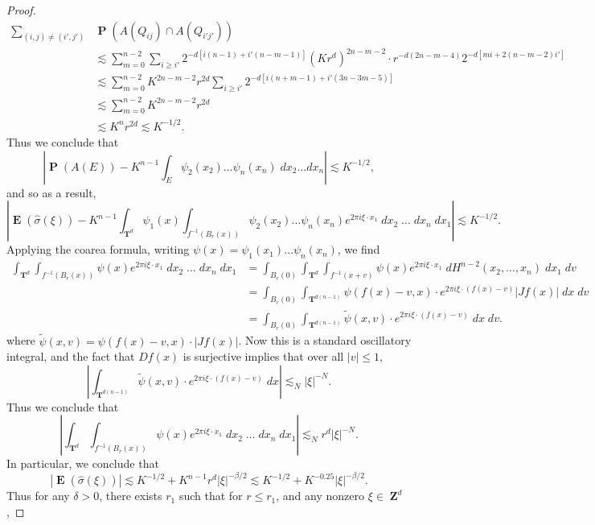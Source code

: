 \documentclass[12pt,reqno]{article}
\numberwithin{equation}{section}
\DeclareMathOperator{\ZZ}{\mathbf{Z}}
\DeclareMathOperator{\TT}{\mathbf{T}}
\numberwithin{theorem}{section}
\DeclareMathOperator{\EE}{\mathbf{E}}
\DeclareMathOperator{\PP}{\mathbf{P}}
\begin{document}
\begin{proof}
    \begin{align*}
        \sum_{(i,j) \neq (i',j')}& \PP(A(Q_{ij}) \cap A(Q_{i'j'}))\\
        &\lesssim \sum_{m = 0}^{n-2} \sum_{i \geq i'} 2^{-d[i(n-1) + i'(n-m-1)]} (Kr^d)^{2n - m - 2} \cdot r^{-d(2n - m - 4)} 2^{-d[mi + 2(n-m-2)i']}\\
        &\lesssim \sum_{m = 0}^{n-2} K^{2n-m-2} r^{2d} \sum_{i \geq i'} 2^{-d[i(n+m-1) + i'(3n-3m-5)]}\\
        &\lesssim \sum_{m = 0}^{n-2} K^{2n-m-2} r^{2d}\\
        &\lesssim K^n r^{2d} \lesssim K^{-1/2}.
    \end{align*}
    Thus we conclude that
    \[ \left| \PP(A(E)) - K^{n-1} \int_E \psi_2(x_2) \dots \psi_n(x_n)\; dx_2 \dots dx_n \right| \lesssim K^{-1/2}, \]
    and so as a result,
    \[ \left| \EE(\widehat{\sigma}(\xi)) - K^{n-1} \int_{\TT^d} \psi_1(x) \int_{f^{-1}(B_r(x))} \psi_2(x_2) \dots \psi_n(x_n) e^{2 \pi i \xi \cdot x_1}\; dx_2\; \dots\; dx_n\; dx_1 \right| \lesssim K^{-1/2}. \]
    Applying the coarea formula, writing $\psi(x) = \psi_1(x_1) \dots \psi_n(x_n)$, we find
    \begin{align*}
        \int_{\TT^d} \int_{f^{-1}(B_r(x))} \psi(x) e^{2 \pi i \xi \cdot x_1}\; dx_2\; \dots\; dx_n\; dx_1 &= \int_{B_r(0)} \int_{\TT^d} \int_{f^{-1}(x + v)} \psi(x) e^{2 \pi i \xi \cdot x_1}\; dH^{n-2}(x_2,\dots,x_n)\; dx_1\; dv\\
        &= \int_{B_r(0)} \int_{\TT^{d(n-1)}} \psi(f(x) - v,x) \cdot e^{2 \pi i \xi \cdot (f(x) - v)} |Jf(x)|\; dx\; dv\\
        &= \int_{B_r(0)} \int_{\TT^{d(n-1)}} \tilde{\psi}(x,v) \cdot e^{2 \pi i \xi \cdot (f(x) - v)}\; dx\; dv.
    \end{align*}
    where $\tilde{\psi}(x,v) = \psi(f(x) - v, x) \cdot |Jf(x)|$. Now this is a standard oscillatory integral, and the fact that $Df(x)$ is surjective implies that over all $|v| \leq 1$,
    \[ \left|\int_{\TT^{d(n-1)}} \tilde{\psi}(x,v) \cdot e^{2 \pi i \xi \cdot (f(x) - v)}\; dx \right| \lesssim_N |\xi|^{-N}. \]
    Thus we conclude that
    \[ \left| \int_{\TT^d} \int_{f^{-1}(B_r(x))} \psi(x) e^{2 \pi i \xi \cdot x_1}\; dx_2\; \dots\; dx_n\; dx_1 \right| \lesssim_N r^d |\xi|^{-N}. \]
    In particular, we conclude that
    \[ |\EE(\widehat{\sigma}(\xi)) | \lesssim K^{-1/2} + K^{n-1} r^d |\xi|^{-\beta/2} \lesssim K^{-1/2} + K^{-0.25} |\xi|^{-\beta/2}. \]
    Thus for any $\delta > 0$, there exists $r_1$ such that for $r \leq r_1$, and any nonzero $\xi \in \ZZ^d$,

\end{proof}
\end{document}
